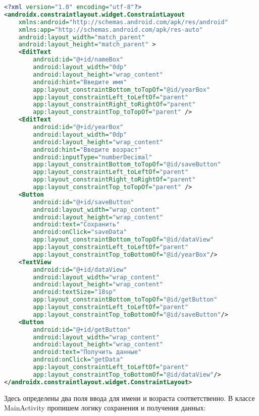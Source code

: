 \begin{lstlisting}[language=XML
	, label=lst:
	]
<?xml version="1.0" encoding="utf-8"?>
<androidx.constraintlayout.widget.ConstraintLayout
    xmlns:android="http://schemas.android.com/apk/res/android"
    xmlns:app="http://schemas.android.com/apk/res-auto"
    android:layout_width="match_parent"
    android:layout_height="match_parent" >
    <EditText
        android:id="@+id/nameBox"
        android:layout_width="0dp"
        android:layout_height="wrap_content"
        android:hint="Введите имя"
        app:layout_constraintBottom_toTopOf="@id/yearBox"
        app:layout_constraintLeft_toLeftOf="parent"
        app:layout_constraintRight_toRightOf="parent"
        app:layout_constraintTop_toTopOf="parent" />
    <EditText
        android:id="@+id/yearBox"
        android:layout_width="0dp"
        android:layout_height="wrap_content"
        android:hint="Введите возраст"
        android:inputType="numberDecimal"
        app:layout_constraintBottom_toTopOf="@id/saveButton"
        app:layout_constraintLeft_toLeftOf="parent"
        app:layout_constraintRight_toRightOf="parent"
        app:layout_constraintTop_toTopOf="parent" />
    <Button
        android:id="@+id/saveButton"
        android:layout_width="wrap_content"
        android:layout_height="wrap_content"
        android:text="Сохранить"
        android:onClick="saveData"
        app:layout_constraintBottom_toTopOf="@id/dataView"
        app:layout_constraintLeft_toLeftOf="parent"
        app:layout_constraintTop_toBottomOf="@id/yearBox"/>
    <TextView
        android:id="@+id/dataView"
        android:layout_width="wrap_content"
        android:layout_height="wrap_content"
        android:textSize="18sp"
        app:layout_constraintBottom_toTopOf="@id/getButton"
        app:layout_constraintLeft_toLeftOf="parent"
        app:layout_constraintTop_toBottomOf="@id/saveButton"/>
    <Button
        android:id="@+id/getButton"
        android:layout_width="wrap_content"
        android:layout_height="wrap_content"
        android:text="Получить данные"
        android:onClick="getData"
        app:layout_constraintLeft_toLeftOf="parent"
        app:layout_constraintTop_toBottomOf="@id/dataView"/>
</androidx.constraintlayout.widget.ConstraintLayout>
\end{lstlisting}

Здесь определены два поля ввода для имени и возраста соответственно.
В классе MainActivity пропишем логику сохранения и получения данных:

